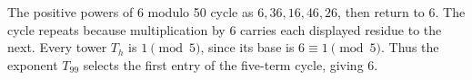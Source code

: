 The positive powers of 6 modulo 50 cycle as $6,36,16,46,26$, then return to 6. The cycle repeats because multiplication by 6 carries each displayed residue to the next. Every tower $T_h$ is $1\pmod5$, since its base is $6\equiv1\pmod5$. Thus the exponent $T_{99}$ selects the first entry of the five-term cycle, giving $\boxed6$.
